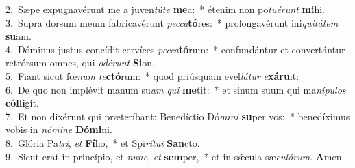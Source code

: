{2.~}Sæpe expugnavérunt me a juven\textit{tú}\textit{te} \textbf{me}a:~* étenim non po\textit{tu}\textit{é}\textit{runt} \textbf{mi}hi.\\
{3.~}Supra dorsum meum fabricavérunt \textit{pec}\textit{ca}\textbf{tó}res:~* prolongavérunt ini\textit{qui}\textit{tá}\textit{tem} \textbf{su}am.\\
{4.~}Dóminus justus concídit cervíces \textit{pec}\textit{ca}\textbf{tó}rum:~* confundántur et convertántur retrórsum omnes, qui \textit{o}\textit{dé}\textit{runt} \textbf{Si}on.\\
{5.~}Fiant sicut fœ\textit{num} \textit{te}\textbf{ctó}rum:~* quod priúsquam evel\textit{lá}\textit{tur} \textit{e}\textbf{xá}\textbf{ru}it:\\
{6.~}De quo non implévit manum su\textit{am} \textit{qui} \textbf{me}tit:~* et sinum suum qui ma\textit{ní}\textit{pu}\textit{los} \textbf{cól}\textbf{li}git.\\
{7.~}Et non dixérunt qui præteríbant: Benedíctio Dó\textit{mi}\textit{ni} \textbf{su}per vos:~* benedíximus vobis in \textit{nó}\textit{mi}\textit{ne} \textbf{Dó}\textbf{mi}ni.\\
{8.~}Glória Pa\textit{tri}, \textit{et} \textbf{Fí}lio,~* et Spi\textit{rí}\textit{tu}\textit{i} \textbf{San}cto.\\
{9.~}Sicut erat in princípio, et \textit{nunc}, \textit{et} \textbf{sem}per,~* et in sǽcula sæ\textit{cu}\textit{ló}\textit{rum}. \textbf{A}men.\\
